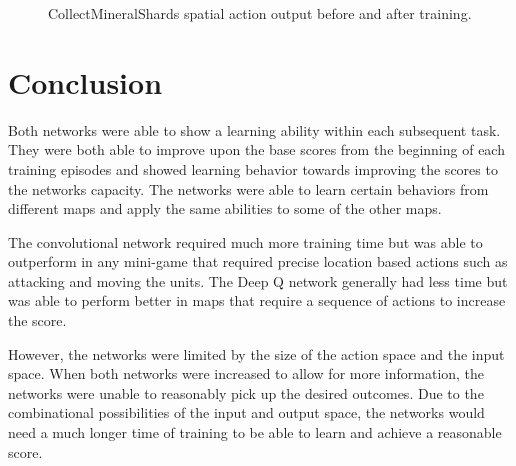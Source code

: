 \begin{figure}[h]
    \centering
    \caption{CollectMineralShards spatial action output before and after training.}%
    \label{fig:cnn-filter2}%
\end{figure}

\section{Conclusion}

Both networks were able to show a learning ability within each subsequent task. They were both able to improve upon the base scores from the beginning of each training episodes and showed learning behavior towards improving the scores to the networks capacity. The networks were able to learn certain behaviors from different maps and apply the same abilities to some of the other maps. 

The convolutional network required much more training time but was able to outperform in any mini-game that required precise location based actions such as attacking and moving the units. The Deep Q network generally had less time but was able to perform better in maps that require a sequence of actions to increase the score. 

However, the networks were limited by the size of the action space and the input space. When both networks were increased to allow for more information, the networks were unable to reasonably pick up the desired outcomes. Due to the combinational possibilities of the input and output space, the networks would need a much longer time of training to be able to learn and achieve a reasonable score. 
